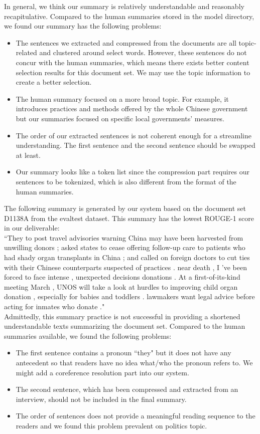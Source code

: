 \documentclass[11pt]{article}
\begin{document}
In general, we think our summary is relatively understandable and reasonably recapitulative. Compared to the human summaries stored in the model directory, we found our summary has the following problems:
\begin{itemize}  
\item The sentences we extracted and compressed from the documents are all topic-related and clustered around select words. However, these sentences do not concur with the human summaries, which means there exists better content selection results for this document set. We may use the topic information to create a better selection.
\item The human summary focused on a more broad topic. For example, it introduces practices and methods offered by the whole Chinese government but our summaries focused on specific local governments' measures.
\item The order of our extracted sentences is not coherent enough for a streamline understanding. The first sentence and the second sentence should be swapped at least.
\item Our summary looks like a token list since the compression part requires our sentences to be tokenized, which is also different from the format of the human summaries.
\end{itemize}

The following summary is generated by our system based on the document set D1138A from the evaltest dataset. This summary has the lowest ROUGE-1 score in our deliverable:\\

``They to post travel advisories warning China may have been harvested from unwilling donors ; asked states to cease offering follow-up care to patients who had shady organ transplants in China ; and called on foreign doctors to cut ties with their Chinese counterparts suspected of practices .
near death , I 've been forced to face intense , unexpected decisions donations .
At a first-of-its-kind meeting March , UNOS will take a look at hurdles to improving child organ donation , especially for babies and toddlers .
lawmakers want legal advice before acting for inmates who donate ."\\

Admittedly, this summary practice is not successful in providing a shortened understandable texts summarizing the document set. Compared to the human summaries available, we found the following problems:
\begin{itemize}
\item The first sentence contains a pronoun ``they" but it does not have any antecedent so that readers have no idea what/who the pronoun refers to. We might add a coreference resolution part into our system.
\item The second sentence, which has been compressed and extracted from an interview, should not be included in the final summary.
\item The order of sentences does not provide a meaningful reading sequence to the readers and we found this problem prevalent on politics topic.
\end{itemize}
\end{document}
